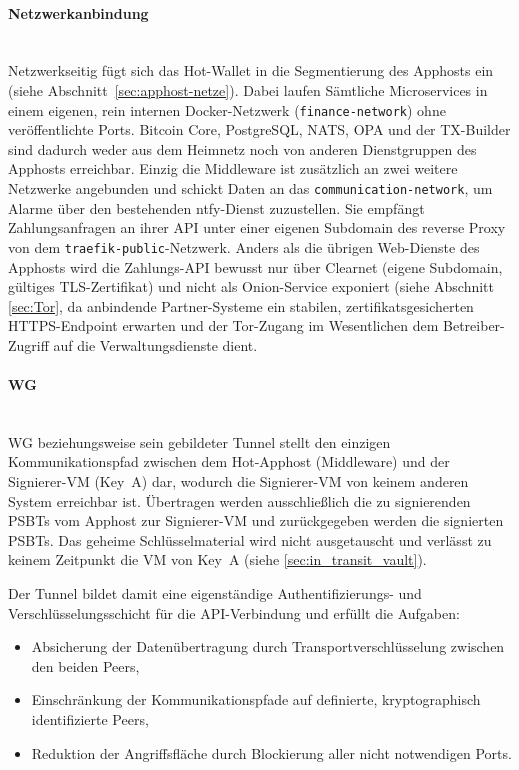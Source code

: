 \paragraph{Netzwerkanbindung} \mbox{}\\
Netzwerkseitig fügt sich das Hot-Wallet in die Segmentierung des Apphosts ein (siehe Abschnitt~\ref{sec:apphost-netze}). Dabei laufen Sämtliche Microservices in einem eigenen, rein internen Docker-Netzwerk (\texttt{finance-network}) ohne veröffentlichte Ports. 
Bitcoin Core, PostgreSQL, \ac{NATS}, \ac{OPA} und der TX-Builder sind dadurch weder aus dem Heimnetz noch von anderen Dienstgruppen des Apphosts erreichbar.
Einzig die Middleware ist zusätzlich an zwei weitere Netzwerke angebunden und schickt Daten an das \texttt{communication-network}, um Alarme über den bestehenden ntfy-Dienst zuzustellen. Sie empfängt Zahlungsanfragen an ihrer \ac{API} unter einer eigenen Subdomain des reverse Proxy von dem \texttt{traefik-public}-Netzwerk.
Anders als die übrigen Web-Dienste des Apphosts wird die Zahlungs-\ac{API} bewusst nur über Clearnet (eigene Subdomain, gültiges TLS-Zertifikat) und nicht als Onion-Service exponiert (siehe Abschnitt \ref{sec:Tor}, da anbindende Partner-Systeme ein stabilen, zertifikatsgesicherten \ac{HTTPS}-Endpoint erwarten und der Tor-Zugang im Wesentlichen dem Betreiber-Zugriff auf die Verwaltungsdienste dient.

\paragraph{\ac{WG}} \mbox{}\\
\ac{WG} beziehungsweise sein gebildeter Tunnel stellt den einzigen Kommunikationspfad zwischen dem Hot-Apphost (Middleware) und der Signierer-\ac{VM} (Key~A) dar, wodurch die Signierer-\ac{VM} von keinem anderen System erreichbar ist. Übertragen werden ausschließlich die zu signierenden \acp{PSBT} vom Apphost zur Signierer-\ac{VM} und zurückgegeben werden die signierten \acp{PSBT}. Das geheime Schlüsselmaterial wird nicht ausgetauscht und verlässt zu keinem Zeitpunkt die \ac{VM} von Key~A (siehe \ref{sec:in_transit_vault}).

Der Tunnel bildet damit eine eigenständige Authentifizierungs- und Verschlüsselungsschicht für die \ac{API}-Verbindung und erfüllt die Aufgaben:
\begin{itemize}
    \item Absicherung der Datenübertragung durch Transportverschlüsselung zwischen den beiden Peers,
    \item Einschränkung der Kommunikationspfade auf definierte, kryptographisch identifizierte Peers,
    \item Reduktion der Angriffsfläche durch Blockierung aller nicht notwendigen Ports.
\end{itemize}

